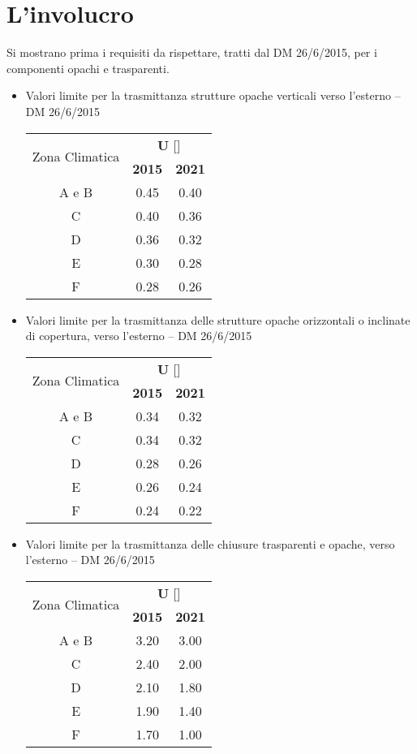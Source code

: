\section{L'involucro}
Si mostrano prima i requisiti da rispettare, tratti dal DM 26/6/2015, per i componenti opachi e trasparenti.
\begin{itemize}
\item Valori limite per la trasmittanza strutture opache verticali verso l'esterno -- DM 26/6/2015
\begin{center}
	\begin{tabular}{ccc}
	\multirow{2}{*}{Zona Climatica} & \multicolumn{2}{c}{\textbf{U} [\trasm]}	\\
	\cmidrule(lr){2-3}
	& \textbf{2015} & \textbf{2021}				\\
	\midrule
	A e B							&	0.45		&	0.40 					\\
	C								& 	0.40		&	0.36					\\
	D								&	0.36		&	0.32					\\
	E								&	0.30		&	0.28					\\
	F								&	0.28		&	0.26					\\
\end{tabular}
\end{center}

\newpage
\item Valori limite per la trasmittanza delle strutture opache orizzontali o inclinate di copertura, verso l'esterno -- DM 26/6/2015
\begin{center}
	\begin{tabular}{ccc}
		\multirow{2}{*}{Zona Climatica} & \multicolumn{2}{c}{\textbf{U} [\trasm]}	\\
		\cmidrule(lr){2-3}
		& \textbf{2015} & \textbf{2021}				\\
		\midrule
		A e B							&	0.34		&	0.32					\\
		C								& 	0.34		&	0.32					\\
		D								&	0.28		&	0.26					\\
		E								&	0.26		&	0.24					\\
		F								&	0.24		&	0.22					\\
	\end{tabular}
\end{center}
\item Valori limite per la trasmittanza delle chiusure trasparenti e opache, verso l'esterno -- DM 26/6/2015
\begin{center}
	\begin{tabular}{ccc}
		\multirow{2}{*}{Zona Climatica} & \multicolumn{2}{c}{\textbf{U} [\trasm]}	\\
		\cmidrule(lr){2-3}
		& \textbf{2015} & \textbf{2021}				\\
		\midrule
		A e B							&	3.20		&	3.00					\\
		C								& 	2.40		&	2.00					\\
		D								&	2.10		&	1.80					\\
		E								&	1.90		&	1.40					\\
		F								&	1.70		&	1.00					\\
	\end{tabular}
\end{center}
\end{itemize}
